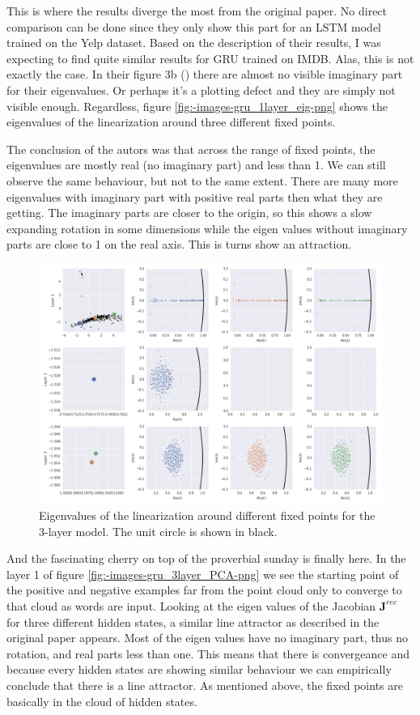 \documentclass{article}
\begin{document}
This is where the results diverge the most from the original paper. No direct comparison can be done since they only show this part for an LSTM model trained on the Yelp dataset. Based on the description of their results, I was expecting to find quite similar results for GRU trained on IMDB. Alas, this is not exactly the case. In their figure 3b (\cite{maheswaranathan2019reverse}) there are almost no visible imaginary part for their eigenvalues. Or perhaps it's a plotting defect and they are simply not visible enough. Regardless, figure \ref{fig:-images-gru_1layer_eig-png} shows the eigenvalues of the linearization around three different fixed points. 

The conclusion of the autors was that across the range of fixed points, the eigenvalues are mostly real (no imaginary part) and less than 1. We can still observe the same behaviour, but not to the same extent. There are many more eigenvalues with imaginary part with positive real parts then what they are getting. The imaginary parts are closer to the origin, so this shows a slow expanding rotation in some dimensions while the eigen values without imaginary parts are close to 1 on the real axis. This is turns show an attraction.

\begin{figure}[h]
  \centering
  \includegraphics[width=1\textwidth]{../images/gru_3layer_100_eig.png}
  \caption{Eigenvalues of the linearization around different fixed points for the 3-layer model.
  The unit circle is shown in black.}
  \label{fig:-images-gru_3layer_eig-png}
\end{figure}

And the fascinating cherry on top of the proverbial sunday is finally here. In the layer 1 of figure \ref{fig:-images-gru_3layer_PCA-png} we see the starting point of the positive and negative examples far from the point cloud only to converge to that cloud as words are input. Looking at the eigen values of the Jacobian $\textbf{J}^{rec}$ for three different hidden states, a similar line attractor as described in the original paper appears. Most of the eigen values have no imaginary part, thus no rotation, and real parts less than one. This means that there is convergeance and because every hidden states are showing similar behaviour we can empirically conclude that there is a line attractor. As mentioned above, the fixed points are basically in the cloud of hidden states.
\end{document}
